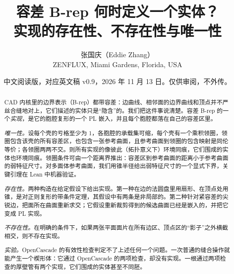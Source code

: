 \documentclass[11pt,UTF8]{ctexart}
\title{容差 B-rep 何时定义一个实体？\\ 实现的存在性、不存在性与唯一性}
\author{张国庆（Eddie Zhang）\\ ZENFLUX, Miami Gardens, Florida, USA}
\date{中文阅读版，对应英文稿 v0.9，2026 年 11 月 13 日。仅供审阅，不外传。}
\theoremstyle{definition}
\theoremstyle{remark}
\begin{document}
\maketitle

\begin{abstract}
CAD 内核里的边界表示（B-rep）都带容差：边曲线、相邻面的边界曲线和顶点并不严丝合缝地对上，它们描述的实体只是``隐含''的。我们把这件事说清楚。容差 B-rep 的一个\emph{实现}，是它的胞腔复形的一个 PL 嵌入，并且每个胞腔都落在自己的容差区里。

\emph{唯一性。}设每个壳的亏格至少为 1，各胞腔的承载集可缩，每个壳有一个乘积领圈，领圈包含该壳的所有容差区，也包含一张参考曲面，且参考曲面到领圈的包含映射是同伦等价；各领圈两两不交。则所有实现的像彼此（拓扑意义下）环境同痕，它们围成的实体也环境同痕。领圈条件可由一个距离界推出：容差区到参考曲面的距离小于参考曲面的弱特征尺寸。对多面体参考曲面，我们用锥半径给出弱特征尺寸的一个显式下界，关键引理在 Lean 中机器验证。

\emph{存在性。}两种构造在给定假设下给出实现。第一种在边的法圆盘里用扇形、在顶点处用锥，是对正则复形的带条件定理，其假设中有两条是非局部的。第二种针对紧容差的尖锐边，把面所在曲面重新求交；它假设重新裁剪得到的候选曲面已经是嵌入的，并把它变成 PL 实现。

\emph{不存在性。}在明确的条件下，如果两张平面面片在所有边区、顶点区的``影子''之外横截相交，则不存在实现。

\emph{实验。}OpenCascade 的有效性检查判定不了上述任何一个问题。一次普通的缝合操作就能产生一个楔形体：它通过 OpenCascade 的两项检查，却没有实现。一根通过两项检查的厚壁管有两个实现，它们围成的实体甚至不同胚。
\end{abstract}









\appendix
\renewcommand{\proofname}{Proof}




\renewcommand{\refname}{参考文献}

\end{document}
